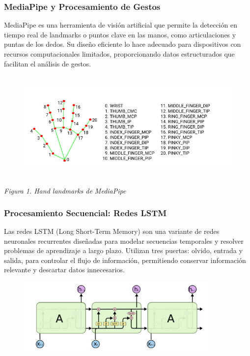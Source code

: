 \documentclass[10pt]{article}
\begin{document}
\subsubsection{MediaPipe y Procesamiento de Gestos}

MediaPipe es una herramienta de visión artificial que permite la detección en tiempo real de landmarks o puntos clave en las manos, como articulaciones y puntas de los dedos. Su diseño eficiente lo hace adecuado para dispositivos con recursos computacionales limitados, proporcionando datos estructurados que facilitan el análisis de gestos. 

\begin{figure}[H]
\centering
\includegraphics[width=14.33cm,height=5.46cm]{./images/image4.png}
\end{figure}


\vspace{1\baselineskip}
\begin{center}
\textit{Figura 1. Hand landmarks de MediaPipe}
\end{center}


\subsubsection{Procesamiento Secuencial: Redes LSTM}

Las redes LSTM (Long Short-Term Memory) son una variante de redes neuronales recurrentes diseñadas para modelar secuencias temporales y resolver problemas de aprendizaje a largo plazo. Utilizan tres puertas: olvido, entrada y salida, para controlar el flujo de información, permitiendo conservar información relevante y descartar datos innecesarios.

\vspace{1\baselineskip}
\begin{figure}[H]
\centering
\includegraphics[width=10.0cm,height=3.79cm]{./images/image6.png}
\end{figure}
\end{document}
